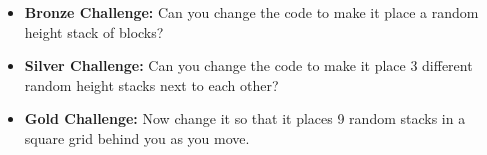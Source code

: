 \documentclass{geocraft-worksheet}
\begin{document}
\begin{itemize}
\item\textbf{Bronze Challenge:} Can you change the code to make it
  place a random height stack of blocks?

\item\textbf{Silver Challenge:} Can you change the code to make it
  place 3 different random height stacks next to each other?

\item\textbf{Gold Challenge:} Now change it so that it places 9 random
  stacks in a square grid behind you as you move.
\end{itemize}
\end{document}
